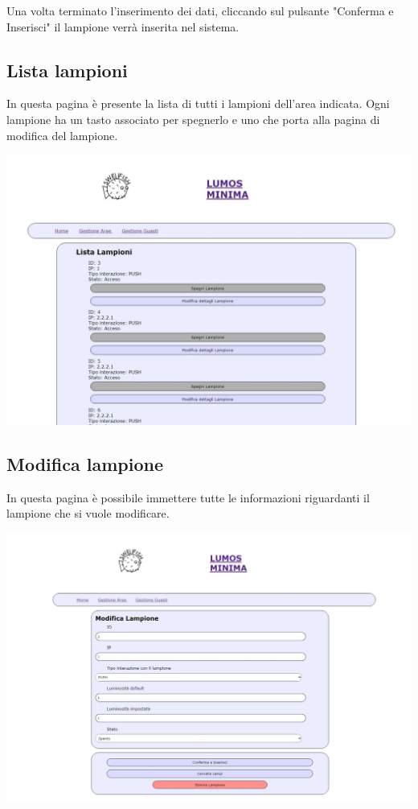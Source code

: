 \documentclass[9pt]{article}
\begin{document}
Una volta terminato l'inserimento dei dati, cliccando sul pulsante "Conferma e Inserisci"
il lampione verrà inserita nel sistema.

\subsection{Lista lampioni}
In questa pagina è presente la lista di tutti i lampioni dell'area indicata.
Ogni lampione ha un tasto associato per spegnerlo e uno che porta alla pagina di modifica del lampione.

\begin{center}
	\includegraphics[scale=0.3]{Lista_lampioni.png}
\end{center}


\subsection{Modifica lampione}
In questa pagina è possibile immettere tutte le informazioni riguardanti il lampione che si vuole modificare.

\begin{center}
	\includegraphics[scale=0.3]{Modifica_lampione.png}
\end{center}
\end{document}
